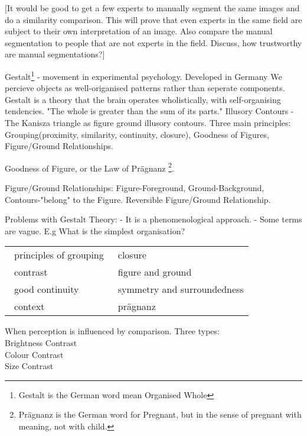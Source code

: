 [It would be good to get a few experts to manually segment the same images and do a similarity comparison. This will prove that even experts in the same field are subject to their own interpretation of an image. Also compare the manual segmentation to people that are not experts in the field. Discuss, how trustworthy are manual segmentations?]

Gestalt\footnote{Gestalt is the German word mean Organised Whole} - movement in experimental psychology. Developed in Germany We percieve objects as well-origanised patterns rather than seperate components. Gestalt is a theory that the brain operates wholistically, with self-organising tendencies. "The whole is greater than the sum of its parts." Illusory Contours - The Kanisza triangle as figure ground illusory contours. Three main principles: Grouping(proximity, similarity, continuity, closure), Goodness of Figures, Figure/Ground Relationships.

Goodness of Figure, or the Law of Pr\"{a}gnanz \footnote{Pr\"{a}gnanz is the German word for Pregnant, but in the sense of pregnant with meaning, not with child.}. 

Figure/Ground Relationships: Figure-Foreground, Ground-Background, Contours-"belong" to the Figure. Reversible Figure/Ground Relationship.

Problems with Gestalt Theory: 
- It is a phenomenological approach.
- Some terms are vague. E.g What is the simplest organisation?

\begin{table}[h!]
	\centering
	\begin{tabular}{ll}
		\textbullet\, principles of grouping 		& \textbullet\, closure \\ 
		\textbullet\, contrast 		& \textbullet\, figure and ground \\ 
		\textbullet\, good continuity 	& \textbullet\, symmetry and surroundedness \\ 
		\textbullet\, context 		& \textbullet\, pr\"{a}gnanz \\ 
	\end{tabular} 
\end{table}

\begin{definition}[Contrast]
	When perception is influenced by comparison. Three types:\\
	Brightness Contrast\\
	Colour Contrast\\
	Size Contrast
\end{definition}

